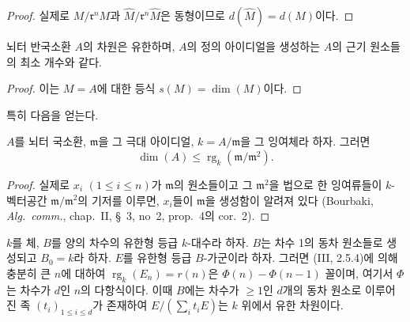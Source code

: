 
\begin{proof}
실제로 $M/\mathfrak{r}^nM$과
$\widehat{M}/\mathfrak{r}^n\widehat{M}$은 동형이므로
$d(\widehat{M})=d(M)$이다.
\end{proof}

\begin{corollary}[16.2.5]
\label{0.16.2.5-fr}
뇌터 반국소환 $A$의 차원은 유한하며, $A$의 정의 아이디얼을 생성하는
$A$의 근기 원소들의 최소 개수와 같다.
\end{corollary}

\begin{proof}
이는 $M=A$에 대한 등식 $s(M)=\dim(M)$이다.
\end{proof}

특히 다음을 얻는다.

\begin{corollary}[16.2.6]
\label{0.16.2.6-fr}
$A$를 뇌터 국소환, $\mathfrak{m}$을 그 극대 아이디얼,
$k=A/\mathfrak{m}$을 그 잉여체라 하자. 그러면
\begin{equation}
\label{0.16.2.6.1-fr}
\tag{16.2.6.1}
  \dim(A)\leq\operatorname{rg}_k(\mathfrak{m}/\mathfrak{m}^2).
\end{equation}
\end{corollary}

\begin{proof}
실제로 $x_i$ $(1\leq i\leq n)$가 $\mathfrak{m}$의 원소들이고 그
$\mathfrak{m}^2$을 법으로 한 잉여류들이 $k$-벡터공간
$\mathfrak{m}/\mathfrak{m}^2$의 기저를 이루면, $x_i$들이
$\mathfrak{m}$을 생성함이 알려져 있다 (Bourbaki,
\emph{Alg.~comm.}, chap.~II, \S~3, no~2, prop.~4의 cor.~2).
\end{proof}

\begin{proposition}[16.2.7]
\label{0.16.2.7-fr}
$k$를 체, $B$를 양의 차수의 유한형 등급 $k$-대수라 하자. $B$는
차수 1의 동차 원소들로 생성되고 $B_0=k$라 하자. $E$를 유한형 등급
$B$-가군이라 하자. 그러면 (III, 2.5.4)에 의해 충분히 큰 $n$에
대하여 $\operatorname{rg}_k(E_n)=r(n)$은
$\Phi(n)-\Phi(n-1)$ 꼴이며, 여기서 $\Phi$는 차수가 $d$인 $n$의
다항식이다. 이때 $B$에는 차수가 $\geq1$인 $d$개의 동차 원소로
이루어진 족 $(t_i)_{1\leq i\leq d}$가 존재하여
$E/(\sum_i t_iE)$는 $k$ 위에서 유한 차원이다.
\end{proposition}

